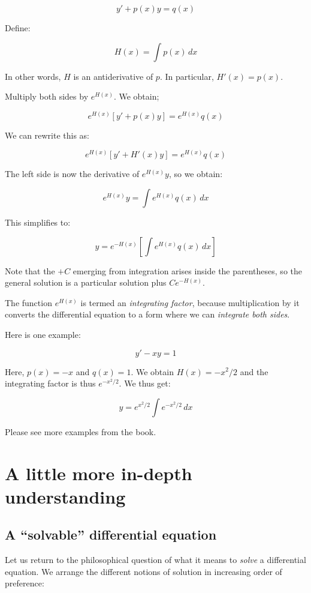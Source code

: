 \documentclass{amsart}
\begin{document}
$$y' + p(x)y = q(x)$$

Define:

$$H(x) = \int p(x) \, dx$$

In other words, $H$ is an antiderivative of $p$. In particular, $H'(x)
= p(x)$.

Multiply both sides by $e^{H(x)}$. We obtain;

$$e^{H(x)}[y' + p(x)y] = e^{H(x)}q(x)$$

We can rewrite this as:

$$e^{H(x)}[y' + H'(x)y] = e^{H(x)}q(x)$$

The left side is now the derivative of $e^{H(x)}y$, so we obtain:

$$e^{H(x)}y = \int e^{H(x)}q(x) \, dx$$

This simplifies to:

$$y = e^{-H(x)} \left[ \int e^{H(x)}q(x) \, dx\right]$$

Note that the $+C$ emerging from integration arises inside the
parentheses, so the general solution is a particular solution plus
$Ce^{-H(x)}$.

The function $e^{H(x)}$ is termed an {\em integrating factor}, because
multiplication by it converts the differential equation to a form where we
can {\em integrate both sides}.

Here is one example:

$$y' - xy = 1$$

Here, $p(x) = -x$ and $q(x) = 1$. We obtain $H(x) = -x^2/2$ and the
integrating factor is thus $e^{-x^2/2}$. We thus get:

$$y = e^{x^2/2} \int e^{-x^2/2} \, dx$$

Please see more examples from the book.

\section{A little more in-depth understanding}

\subsection{A ``solvable'' differential equation}

Let us return to the philosophical question of what it means to {\em
solve} a differential equation. We arrange the different notions of
solution in increasing order of preference:
\end{document}
